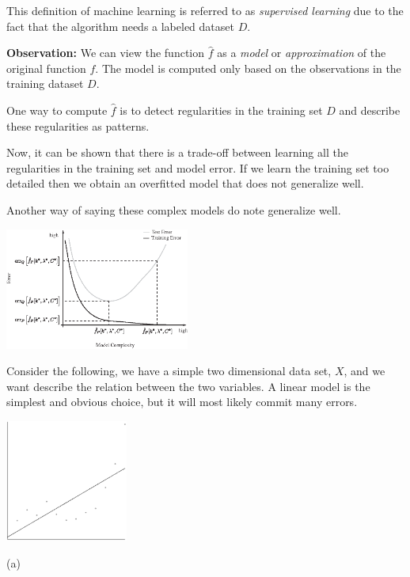 \documentclass[a4paper,blends,pdf,colorBG,slideColor]{prosper}
\begin{document}
This definition of machine learning is referred to as {\em supervised learning}
due to the fact that the algorithm needs a labeled dataset $D$.

{\bf Observation:} We can view the function $\hat{f}$ as a {\em model} or {\em approximation}
of the original function $f$.  The model is computed only based on the 
observations in the training dataset $D$.
\es
 
One way to compute $\hat{f}$ is to detect regularities in the training set $D$ and describe these
regularities as patterns.

Now, it can be shown that there is a trade-off between learning all the regularities in the training set
and model error.  If we learn the training set too detailed then we obtain an overfitted model
that does not generalize well.

Another way of saying these complex models do note generalize well.

\begin{center}
\includegraphics[height=40mm]{images/fig09-02.eps}
\end{center}

\es



Consider the following, we have a simple two dimensional data set, $X$, and we want describe
the relation between the two variables.  A linear model is the simplest and obvious choice, but
it will most likely commit many errors.

\begin{center}
\includegraphics[height=40mm]{images/linear.eps}

(a)
\end{center}
\end{document}
